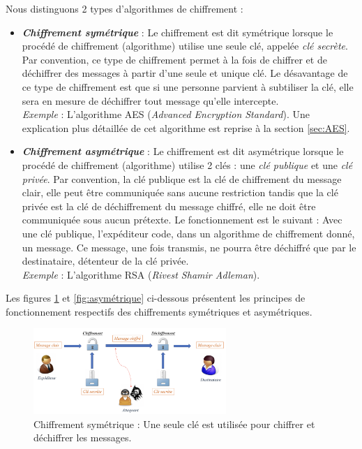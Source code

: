 \documentclass[10pt, oneside, a4paper]{article}
\begin{document}
\newpage

Nous distinguons 2 types d'algorithmes de chiffrement : 
\begin{itemize}
\item \textbf{\textit{Chiffrement symétrique}} : Le chiffrement est dit symétrique lorsque le procédé de chiffrement (algorithme) utilise une seule clé, appelée \textit{clé secrète}. Par convention, ce type de chiffrement permet à la fois de chiffrer et de déchiffrer des messages à partir d'une seule et unique clé. Le désavantage de ce type de chiffrement est que si une personne parvient à subtiliser la clé, elle sera en mesure de déchiffrer tout message qu'elle intercepte.  \\
\textit{Exemple} : L'algorithme AES (\textit{Advanced Encryption Standard}). Une explication plus détaillée de cet algorithme est reprise à la section \ref{sec:AES}.
\item \textbf{\textit{Chiffrement asymétrique}} : Le chiffrement est dit asymétrique lorsque le procédé de chiffrement (algorithme) utilise 2 clés : une \textit{clé publique} et une \textit{clé privée}. Par convention, la clé publique est la clé de chiffrement du message clair, elle peut être communiquée sans aucune restriction tandis que la clé privée est la clé de déchiffrement du message chiffré, elle ne doit être communiquée sous aucun prétexte. Le fonctionnement est le suivant : Avec une clé publique, l'expéditeur code, dans un algorithme de chiffrement donné, un message. Ce message, une fois transmis, ne pourra être déchiffré que par le destinataire, détenteur de la clé privée. \\
\textit{Exemple} : L'algorithme RSA (\textit{Rivest Shamir Adleman}). \\
\end{itemize}

Les figures \ref{fig:symétrique} et \ref{fig:asymétrique} ci-dessous présentent les principes de fonctionnement respectifs des chiffrements symétriques et asymétriques.

\begin{figure}[htbp]
    \centering
    \includegraphics[width=0.65\textwidth]{image/symetrique}
    \caption{Chiffrement symétrique : Une seule clé est utilisée pour chiffrer et déchiffrer les messages.}
    \label{fig:symétrique}
\end{figure}
\end{document}
